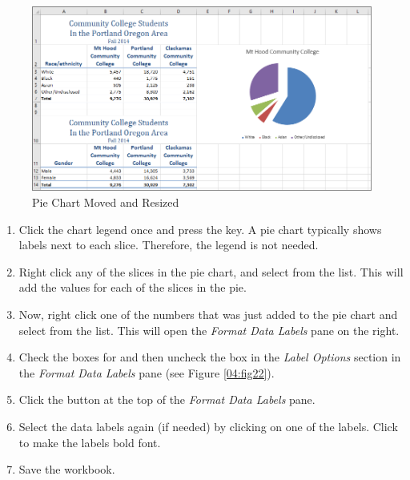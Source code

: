 \begin{figure}[H]
	\centering
	\includegraphics[width=\maxwidth{.95\linewidth}]{gfx/ch04_fig21}
	\caption{Pie Chart Moved and Resized}
	\label{04:fig21}
\end{figure}

\begin{enumerate}[resume]
	\item Click the chart legend once and press the  key. A pie chart typically shows labels next to each slice. Therefore, the legend is not needed.
	\item Right click any of the slices in the pie chart, and select  from the list. This will add the values for each of the slices in the pie.
	\item Now, right click one of the numbers that was just added to the pie chart and select  from the list. This will open the \textit{Format Data Labels} pane on the right.
	\item Check the boxes for  and  then uncheck the  box in the \textit{Label Options} section in the \textit{Format Data Labels} pane (see Figure \ref{04:fig22}).
	\item Click the  button at the top of the \textit{Format Data Labels} pane.
	\item Select the data labels again (if needed) by clicking on one of the labels. Click  to make the labels bold font.
	\item Save the  workbook.
\end{enumerate}

